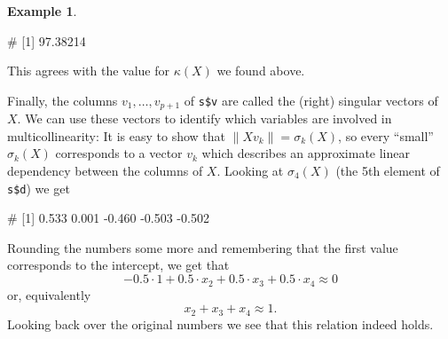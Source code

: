 \documentclass[
  a4paper,
]{article}
\newenvironment{Shaded}{\begin{snugshade}}{\end{snugshade}}
\newcommand{\DecValTok}[1]{\textcolor[rgb]{0.00,0.00,0.81}{#1}}
\newcommand{\FunctionTok}[1]{\textcolor[rgb]{0.13,0.29,0.53}{\textbf{#1}}}
\newcommand{\NormalTok}[1]{#1}
\newcommand{\SpecialCharTok}[1]{\textcolor[rgb]{0.81,0.36,0.00}{\textbf{#1}}}
\theoremstyle{definition}
\theoremstyle{definition}
\newtheorem{example}{Example}[section]
\theoremstyle{definition}
\theoremstyle{definition}
\theoremstyle{remark}
\begin{document}
\begin{example}
\begin{Shaded}
\end{Shaded}

\begin{Shaded}
\begin{Highlighting}[]
\NormalTok{\# [1] 97.38214}
\end{Highlighting}
\end{Shaded}

This agrees with the value for \(\kappa(X)\) we found above.

Finally, the columns \(v_1, \ldots, v_{p+1}\) of \texttt{s\$v} are called the (right)
singular vectors of~\(X\). We can use these vectors to identify which variables
are involved in multicollinearity: It is easy to show that \(\| X v_k \| =
\sigma_k(X)\), so every ``small'' \(\sigma_k(X)\) corresponds to a vector \(v_k\)
which describes an approximate linear dependency between the columns of \(X\).
Looking at \(\sigma_4(X)\) (the 5th element of \texttt{s\$d}) we get

\begin{Shaded}
\end{Shaded}

\begin{Shaded}
\begin{Highlighting}[]
\NormalTok{\# [1]  0.533  0.001 {-}0.460 {-}0.503 {-}0.502}
\end{Highlighting}
\end{Shaded}

Rounding the numbers some more and remembering that the first
value corresponds to the intercept, we get that
\begin{equation*}
  -0.5 \cdot 1 + 0.5 \cdot x_2 + 0.5 \cdot x_3 + 0.5 \cdot x_4
  \approx 0
\end{equation*}
or, equivalently
\begin{equation*}
  x_2 + x_3 + x_4
  \approx 1.
\end{equation*}
Looking back over the original numbers we see that this relation
indeed holds.
\end{example}
\end{document}
